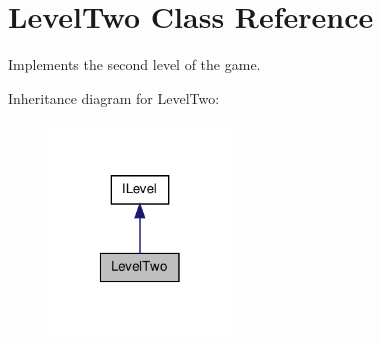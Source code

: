 \hypertarget{class_level_two}{\section{Level\-Two Class Reference}
\label{class_level_two}
}


Implements the second level of the game.  




Inheritance diagram for Level\-Two\-:\nopagebreak
\begin{figure}[H]
\begin{center}
\leavevmode
\includegraphics[width=138pt]{class_level_two__inherit__graph}
\end{center}
\end{figure}
